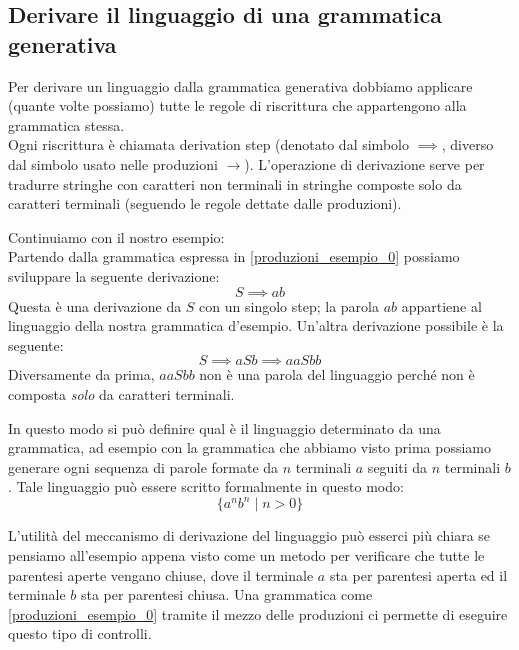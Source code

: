 \documentclass[class=book, crop=false, oneside, 12pt]{standalone}
\begin{document}
\subsection{Derivare il linguaggio di una grammatica generativa}
Per derivare un linguaggio dalla grammatica generativa dobbiamo applicare (quante volte possiamo) tutte le regole di riscrittura che appartengono alla grammatica stessa.\\
Ogni riscrittura è chiamata derivation step (denotato dal simbolo \(\implies\), diverso dal simbolo usato nelle produzioni \(\to\)).
L’operazione di derivazione serve per tradurre stringhe con caratteri non terminali in stringhe composte solo da caratteri terminali (seguendo le regole dettate dalle produzioni).


Continuiamo con il nostro esempio:\\
Partendo dalla grammatica espressa in \ref{produzioni_esempio_0} possiamo sviluppare la seguente derivazione:
\begin{equation}
    S \implies ab
\end{equation}
Questa è una derivazione da \(S\) con un singolo step; la parola \(ab\) appartiene al linguaggio della nostra grammatica d’esempio.
Un'altra derivazione possibile è la seguente:
\begin{equation}
    S \implies aSb \implies aaSbb
\end{equation}
Diversamente da prima, \(aaSbb\) non è una parola del linguaggio perché non è composta \emph{solo} da caratteri terminali.

In questo modo si può definire qual è il linguaggio determinato da una grammatica, ad esempio con la grammatica che abbiamo visto prima possiamo generare ogni sequenza di parole formate da \(n\) terminali \(a\) seguiti da \(n\) terminali \(b\).
Tale linguaggio può essere scritto formalmente in questo modo:
\begin{equation}
    \{a^n b^n \mid n>0\}
\end{equation}


L'utilità del meccanismo di derivazione del linguaggio può esserci più chiara se pensiamo all'esempio appena visto come un metodo per verificare che tutte le parentesi aperte vengano chiuse, dove il terminale \(a\) sta per parentesi aperta ed il terminale \(b\) sta per parentesi chiusa. Una grammatica come \ref{produzioni_esempio_0} tramite il mezzo delle produzioni ci permette di eseguire questo tipo di controlli.
\end{document}
